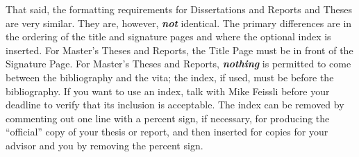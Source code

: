That said, the formatting requirements for Dissertations and Reports and
Theses are very similar. They are, however, \textbf{\textit{not}} identical.
The primary differences are in the ordering of the title and signature
pages and where the optional index is inserted. For Master's Theses
and Reports, the Title Page must be in front of the Signature Page. For
Master's Theses and Reports, \textbf{\textit{nothing}} is permitted to
come between the bibliography and the vita; the index, if used, must be
before the bibliography. If you want to use an index, talk with Mike
Feissli before your deadline to verify that its inclusion is
acceptable. The index can be removed by commenting out one line with a
percent sign, if necessary, for producing the ``official'' copy of your
thesis or report, and then inserted for copies for your advisor and
you by removing the percent sign.

